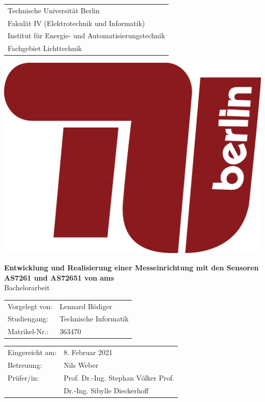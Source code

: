 \documentclass[a4paper,oneside,12pt,titlepage]{scrartcl}   %
\begin{document}

\begin{titlepage}
\begin{center}
	\begin{minipage}{0.6\textwidth}
	\begin{tabular}{l}
	Technische Universität Berlin\\
	Fakulät IV (Elektrotechnik und Informatik)\\
	Institut für Energie- und Automatisierungstechnik\\
	Fachgebiet Lichttechnik\\
	\end{tabular}
	\end{minipage}
	\hfill
	\begin{minipage}{0.3\textwidth}\raggedright
	\includegraphics[scale=0.06]{tu-logo}\\
	\end{minipage}
	
	\vspace{3cm}
    \sffamily \LARGE \textbf{Entwicklung und Realisierung einer Messeinrichtung mit den Sensoren AS7261 und AS72651 von ams}\\
 	\Large Bachelorarbeit\\
    \vspace{2.5cm}
	{\renewcommand{\arraystretch}{0.7}
    	\begin{tabular}{ll}
    		Vorgelegt von: & Lennard Bödiger\\
			Studiengang:	 & Technische Informatik\\
			Matrikel-Nr.: & 363470\\
		\end{tabular}
	}

  	\vspace{5.3cm}
	\end{center}
	\begin{tabular}{ll}
		Eingereicht am: & 8. Februar 2021\\
		Betreuung: & Nils Weber\\
		Prüfer/in: & Prof. Dr.-Ing. Stephan Völker Prof.\\ 	& Dr.-Ing. Sibylle Dieckerhoff
	\end{tabular}\\
\end{titlepage}
\end{document}
